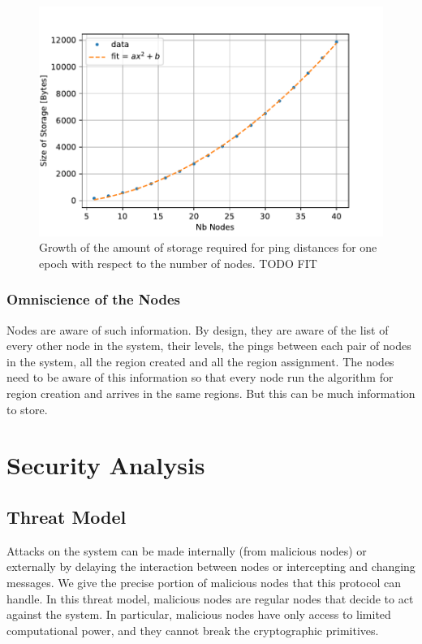 \documentclass[a4paper,11pt,oneside]{report}
\begin{document}
\begin{figure}[!h] 
\centering
\includegraphics[width=350pt]{figures/storage-plot}
\caption{Growth of the amount of storage required for ping distances for one epoch with
 respect to the number of nodes. \color{red} TODO FIT \color{black} } \label{fig:storage-plot}
\end{figure}

 
\subsubsection{Omniscience of the Nodes}
Nodes are aware of such information. By design, they are aware of
the list of every other node in the system, their levels, the pings between
each pair of nodes in the system, all the region created and all the region
assignment. The nodes need to be aware of this information so that
every node run the algorithm for region creation and arrives in the same
regions. But this can be much information to store.

\section{Security Analysis}

\subsection{Threat Model}
Attacks on the system can be made internally (from malicious nodes) or
externally by delaying the interaction between nodes or intercepting and
changing messages. We give the precise portion of malicious nodes that
this protocol can handle. In this threat model, malicious nodes are regular
nodes that decide to act against the system. In particular, malicious nodes
have only access to limited computational power, and they cannot break the
cryptographic primitives. 
\end{document}

